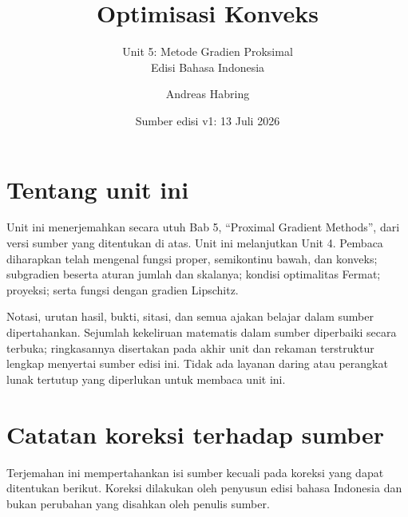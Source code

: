 \documentclass[indonesian]{shinybook}
\title{Optimisasi Konveks}
\subtitle{Unit 5: Metode Gradien Proksimal\\Edisi Bahasa Indonesia}
\author{Andreas Habring}
\date{Sumber edisi v1: 13 Juli 2026}
\begin{document}
\maketitle

\frontmatter
\chapter*{Tentang unit ini}
Unit ini menerjemahkan secara utuh Bab 5, \enquote{Proximal Gradient Methods}, dari versi sumber yang ditentukan di atas. Unit ini melanjutkan Unit 4. Pembaca diharapkan telah mengenal fungsi proper, semikontinu bawah, dan konveks; subgradien beserta aturan jumlah dan skalanya; kondisi optimalitas Fermat; proyeksi; serta fungsi dengan gradien Lipschitz.

Notasi, urutan hasil, bukti, sitasi, dan semua ajakan belajar dalam sumber dipertahankan. Sejumlah kekeliruan matematis dalam sumber diperbaiki secara terbuka; ringkasannya disertakan pada akhir unit dan rekaman terstruktur lengkap menyertai sumber edisi ini. Tidak ada layanan daring atau perangkat lunak tertutup yang diperlukan untuk membaca unit ini.

\tableofcontents
\mainmatter
\setcounter{chapter}{4}


\backmatter
\chapter*{Catatan koreksi terhadap sumber}
Terjemahan ini mempertahankan isi sumber kecuali pada koreksi yang dapat ditentukan berikut. Koreksi dilakukan oleh penyusun edisi bahasa Indonesia dan bukan perubahan yang disahkan oleh penulis sumber.
\end{document}
